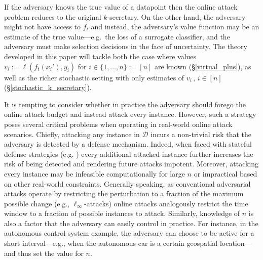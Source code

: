 If the adversary knows the true value of a datapoint then the online attack problem reduces to the original $k$-secretary. On the other hand, the adversary might not have access to $f_t$ and instead, the adversary's value function may be an estimate of the true value---e.g.\ the loss of a surrogate classifier, and the adversary must make selection decisions in the face of uncertainty. The theory developed in this paper will tackle both the case where values $v_i:=\ell(f_t(x_i'),y_i)$ for $i \in \{1,\ldots,n\} :=[n]$ are known (\S\ref{virtual_plus}), as well as the richer stochastic setting with only estimates of $v_i\,,\, i \in [n]$ (\S\ref{stochastic_k_secretary}).


 It is tempting to consider whether in practice the adversary should forego the online attack budget and instead attack every instance. However, such a strategy poses several critical problems when operating in real-world online attack scenarios. Chiefly, attacking any instance in $\mathcal{D}$ incurs a non-trivial risk that the adversary is detected by a defense mechanism. Indeed, when faced with stateful defense strategies (e.g. \cite{chen2020stateful}) every additional attacked instance further increases the risk of being detected and rendering future attacks impotent. Moreover, attacking every instance may be infeasible computationally for large $n$ or impractical based on other real-world constraints. Generally speaking, as conventional adversarial attacks operate by restricting the perturbation to a fraction of the maximum possible change (e.g., $\ell_{\infty}$-attacks) online attacks analogously restrict the time window to a fraction of possible instances to attack. Similarly, knowledge of $n$ is also a factor that the adversary can easily control in practice. For instance, in the autonomous control system example, the adversary can choose to be active for a short interval---e.g., when the autonomous car is a certain geospatial location---and thus set the value for $n$.

